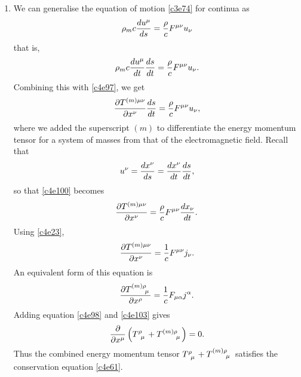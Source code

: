 \begin{enumerate}
\item We can generalise the equation of motion \eqref{c3e74} for continua as
\begin{equation}\label{c4e99}
\rho_m c\frac{d{u^\mu}}{d{s}} = \frac{\rho}{c}F^{\mu\nu}u_\nu
\end{equation}
that is,
\[
\rho_m c\frac{d{u^\mu}}{d{t}}\frac{d{s}}{d{t}} = \frac{\rho}{c}F^{\mu\nu}u_\nu.
\]
Combining this with \eqref{c4e97}, we get
\begin{equation}\label{c4e100}
\frac{\partial{T^{(m)\mu\nu}}}{\partial{x^\nu}}\frac{d{s}}{d{t}} = \frac{\rho}{c}F^{\mu\nu}u_\nu,
\end{equation}
where we added the superscript $(m)$ to differentiate the energy momentum tensor
for a system of masses from that of the electromagnetic field. Recall that
\[
u^\nu = \frac{d{x^\nu}}{d{s}} = \frac{d{x^\nu}}{d{t}}\frac{d{s}}{d{t}},
\]
so that \eqref{c4e100} becomes
\begin{equation}\label{c4e101}
\frac{\partial{T^{(m)\mu\nu}}}{\partial{x^\nu}} = \frac{\rho}{c}F^{\mu\nu}\frac{d{x_\nu}}{d{t}}.
\end{equation}
Using \eqref{c4e23},
\begin{equation}\label{c4e102}
\frac{\partial{T^{(m)\mu\nu}}}{\partial{x^\nu}} = \frac{1}{c}F^{\mu\nu}j_\nu.
\end{equation}
An equivalent form of this equation is
\begin{equation}\label{c4e103}
\pdt{\tensor{T}{^{(m)\rho}_\mu}}{x^\rho} = \frac{1}{c}F_{\mu\alpha}j^\alpha.
\end{equation}
Adding equation \eqref{c4e98} and \eqref{c4e103} gives
\begin{equation}\label{c4e104}
\frac{\partial}{\partial x^\mu}\left(\tensor{T}{^\rho_\mu} + \tensor{T}{^{(m)\rho}_\mu}\right) = 0.
\end{equation}
Thus the combined energy momentum tensor $\tensor{T}{^\rho_\mu} + \tensor{T}{^{(m)\rho}_\mu}$
satisfies the conservation equation \eqref{c4e61}.
\end{enumerate}

